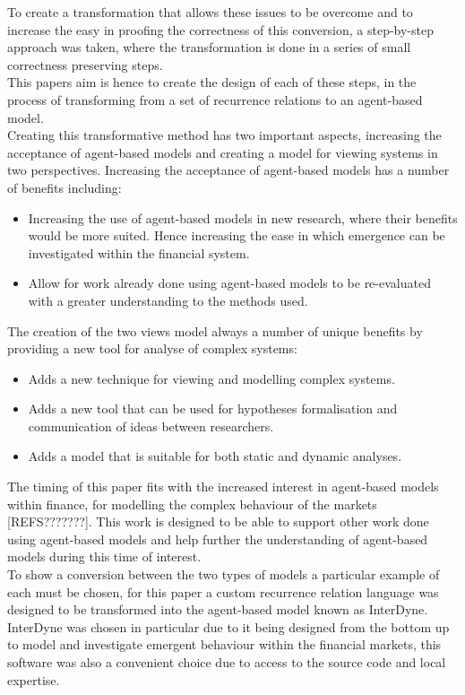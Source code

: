\documentclass{article}
\begin{document}
To create a transformation that allows these issues to be overcome and to increase the easy in proofing the correctness of this conversion, a step-by-step approach was taken, where the transformation is done in a series of small correctness preserving steps.\\  
This papers aim is hence to create the design of each of these steps, in the process of transforming from a set of recurrence relations to an agent-based model.\\ 
Creating this transformative method has  two important aspects, increasing the acceptance of agent-based models and creating a model for viewing systems in two perspectives. Increasing the acceptance of agent-based models has a number of benefits including: 
\begin{itemize}
   \item Increasing the use of agent-based models in new research, where their benefits would be more suited. Hence increasing the ease in which emergence can be investigated within the financial system. 
   \item Allow for work already done using agent-based models to be re-evaluated with a greater understanding to the methods used. 
\end{itemize}
The creation of the two views model always a number of unique benefits by providing a new tool for analyse of complex systems: 
 \begin{itemize}
    \item Adds a new technique for viewing and modelling complex systems.
    \item Adds a new tool that can be used for hypotheses formalisation and communication of ideas between researchers. 
    \item Adds a model that is suitable for both static and dynamic analyses. 
 \end{itemize}
The timing of this paper fits with the increased interest in agent-based models within finance, for modelling the complex behaviour of the markets [REFS???????]. %
This work is designed to be able to support other work done using agent-based models and help further the understanding of agent-based models during this time of interest.\\
To show a conversion between the two types of models a particular example of each must be chosen, for this paper a custom recurrence relation language was designed to be transformed into the agent-based model known as InterDyne. InterDyne was chosen in particular due to it being designed from the bottom up to model and investigate emergent behaviour within the financial markets, this software was also a convenient choice due to access to the source code and local expertise.\\    
\end{document}
